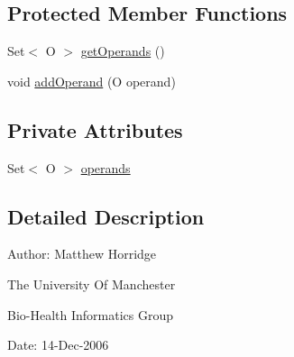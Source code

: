\subsection*{Protected Member Functions}
\begin{DoxyCompactItemize}
\item 
Set$<$ O $>$ \hyperlink{classorg_1_1coode_1_1owlapi_1_1owlxmlparser_1_1_abstract_operand_axiom_element_handler_3_01_o_01extends_01_o_w_l_object_01_4_ac1bfa76cc63b44f13fa8cb380e94b004}{get\-Operands} ()
\item 
void \hyperlink{classorg_1_1coode_1_1owlapi_1_1owlxmlparser_1_1_abstract_operand_axiom_element_handler_3_01_o_01extends_01_o_w_l_object_01_4_a8190626b969c62d261fce650f2f5ba40}{add\-Operand} (O operand)
\end{DoxyCompactItemize}
\subsection*{Private Attributes}
\begin{DoxyCompactItemize}
\item 
Set$<$ O $>$ \hyperlink{classorg_1_1coode_1_1owlapi_1_1owlxmlparser_1_1_abstract_operand_axiom_element_handler_3_01_o_01extends_01_o_w_l_object_01_4_a127bbe24b3aa27a0ea6947d1d0b90b58}{operands}
\end{DoxyCompactItemize}


\subsection{Detailed Description}
Author\-: Matthew Horridge\par
 The University Of Manchester\par
 Bio-\/\-Health Informatics Group\par
 Date\-: 14-\/\-Dec-\/2006\par
\par
 

